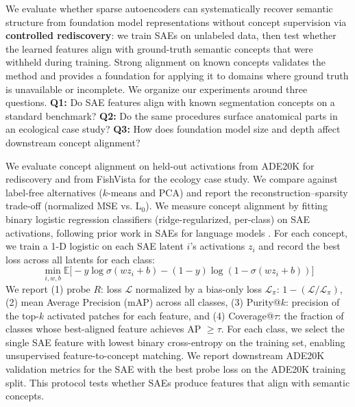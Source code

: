 \documentclass[10pt,twocolumn,letterpaper]{article}
\begin{document}
We evaluate whether sparse autoencoders can systematically recover semantic structure from foundation model representations without concept supervision via \textbf{controlled rediscovery}: we train SAEs on unlabeled data, then test whether the learned features align with ground-truth semantic concepts that were withheld during training.
Strong alignment on known concepts validates the method and provides a foundation for applying it to domains where ground truth is unavailable or incomplete.
We organize our experiments around three questions.
\textbf{Q1:} Do SAE features align with known segmentation concepts on a standard benchmark?  
\textbf{Q2:} Do the same procedures surface anatomical parts in an ecological case study?
\textbf{Q3:} How does foundation model size and depth affect downstream concept alignment?

We evaluate concept alignment on held-out activations from ADE20K for rediscovery and from FishVista for the ecology case study.
We compare against label-free alternatives ($k$-means and PCA) and report the reconstruction–sparsity trade-off (normalized MSE vs. L$_0$).
We measure concept alignment by fitting binary logistic regression classifiers (ridge-regularized, per-class) on SAE activations, following prior work in SAEs for language models \citep{gao2025scaling}.
For each concept, we train a 1-D logistic on each SAE latent $i$'s activations $z_i$ and record the best loss across all latents for each class:
\begin{equation}\label{eq:probe-loss}
    \min_{i,w,b} \mathbb{E} \big[-y \log \sigma (wz_i + b) - (1-y) \log (1 - \sigma (wz_i+b)) \big]
\end{equation}
We report (1) probe $R$: loss $\mathcal{L}$ normalized by a bias-only loss $\mathcal{L}_\pi$: $1 - (\mathcal{L}/\mathcal{L}_\pi)$, (2) mean Average Precision (mAP) across all classes, (3) Purity@$k$: precision of the top-$k$ activated patches for each feature, and (4) Coverage@$\tau$: the fraction of classes whose best-aligned feature achieves AP $\geq \tau$. 
For each class, we select the single SAE feature with lowest binary cross-entropy on the training set, enabling unsupervised feature-to-concept matching.
We report downstream ADE20K validation metrics for the SAE with the best probe loss on the ADE20K training split.
This protocol tests whether SAEs produce features that align with semantic concepts.
\end{document}
